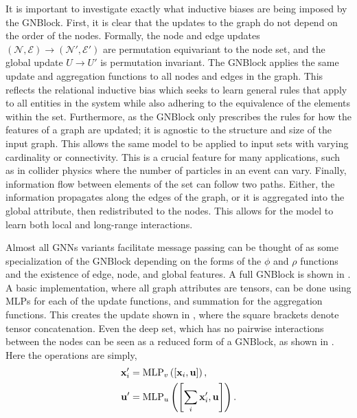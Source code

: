 It is important to investigate exactly what inductive biases are being imposed by the \Gls{GNBlock}.
First, it is clear that the updates to the graph do not depend on the order of the nodes.
Formally, the node and edge updates $(\mathcal{N}, \mathcal{E}) \rightarrow (\mathcal{N}', \mathcal{E}')$ are permutation equivariant to the node set, and the global update $U \rightarrow U'$ is permutation invariant.
The \Gls{GNBlock} applies the same update and aggregation functions to all nodes and edges in the graph.
This reflects the relational inductive bias which seeks to learn general rules that apply to all entities in the system while also adhering to the equivalence of the elements within the set.
Furthermore, as the \Gls{GNBlock} only prescribes the rules for how the features of a graph are updated; it is agnostic to the structure and size of the input graph.
This allows the same model to be applied to input sets with varying cardinality or connectivity.
This is a crucial feature for many applications, such as in collider physics where the number of particles in an event can vary.
Finally, information flow between elements of the set can follow two paths.
Either, the information propagates along the edges of the graph, or it is aggregated into the global attribute, then redistributed to the nodes.
This allows for the model to learn both local and long-range interactions.

Almost all \Glspl{GNN} variants facilitate message passing can be thought of as some specialization of the \Gls{GNBlock} depending on the forms of the $\phi$ and $\rho$ functions and the existence of edge, node, and global features.
A full \Gls{GNBlock} is shown in .
A basic implementation, where all graph attributes are tensors, can be done using \Glspl{MLP} for each of the update functions, and summation for the aggregation functions.
This creates the update shown in , where the square brackets denote tensor concatenation.
Even the deep set, which has no pairwise interactions between the nodes can be seen as a reduced form of a \Gls{GNBlock}, as shown in .
Here the operations are simply,
\begin{align}
    \mathbf{x}_i' & = \text{MLP}_v\left(\left[\mathbf{x}_i, \mathbf{u}\right]\right),           \\
    \mathbf{u}'   & = \text{MLP}_u\left(\left[\sum_{i} \mathbf{x}_i', \mathbf{u}\right]\right).
\end{align}

